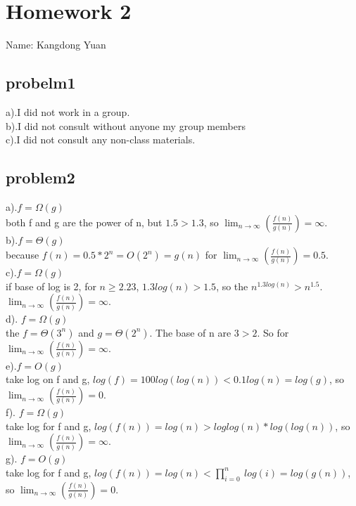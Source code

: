 \documentclass[11pt]{article}
\begin{document}
\section{Homework 2}
Name: Kangdong Yuan
	
\subsection{probelm1}
a).I did not work in a group.
\\b).I did not consult without anyone my group members
\\c).I did not consult any non-class materials.

\subsection{problem2}
a).$f=\Omega(g)$\\ both f and g are the power of n, but $1.5>1.3$, so $\lim _{n\to \infty }\left(\frac{f\left(n\right)}{g\left(n\right)}\right)=\infty $.
\\b).$f=\Theta (g)$
\\ because $f(n)=0.5*2^{n}=O(2^n)=g(n)$ for $\lim _{n\to \infty }\left(\frac{f\left(n\right)}{g\left(n\right)}\right)=0.5$.
\\c).$f=\Omega (g)$
\\if base of log is 2, for $n\geq 2.23$, $1.3log(n)>1.5$, so the $n^{1.3log(n)}>n^{1.5}$. $\lim _{n\to \infty }\left(\frac{f\left(n\right)}{g\left(n\right)}\right)=\infty $.
\\d). $f=\Omega(g)$ 
\\ the $f=\Theta(3^n)$ and $g=\Theta(2^n)$. The base of n are $3>2$. So for $\lim _{n\to \infty }\left(\frac{f\left(n\right)}{g\left(n\right)}\right)=\infty $.
\\e).$f=O(g)$
\\ take log on f and g, $log(f)=100log(log(n))<0.1log(n)=log(g)$, so $\lim _{n\to \infty }\left(\frac{f\left(n\right)}{g\left(n\right)}\right)=0 $.
\\f). $f=\Omega (g)$
\\take log for f and g, $log(f(n))=log(n)>loglog(n)*log(log(n))$, so $\lim _{n\to \infty }\left(\frac{f\left(n\right)}{g\left(n\right)}\right)=\infty $.
\\g). $f=O(g)$
\\take log for f and g, $log(f(n))=log(n)<\prod _{i=0}^n\:log\left(i\right)=log(g(n))$,
\\so $\lim _{n\to \infty }\left(\frac{f\left(n\right)}{g\left(n\right)}\right)=0 $.
\end{document}
